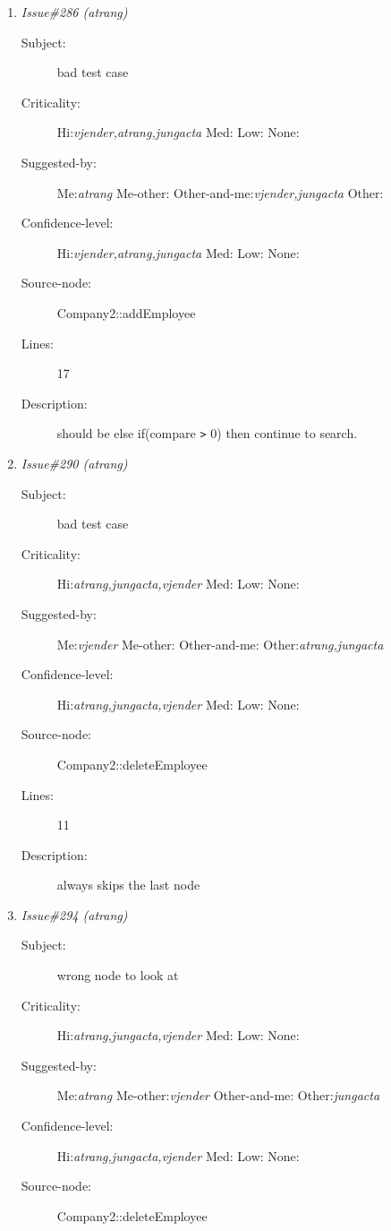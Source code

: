 \begin{enumerate}
\begin{description}
\item [Lines:] 29

\item [Description:] what if the link list is empty?  Will crash for an empty list.
\end{description}
\item {\it Issue\#286 (atrang)}
\begin{description}
\item [Subject:] bad test case
\item [Criticality:] Hi:{\it vjender,atrang,jungacta} Med:{\it } Low:{\it } None:{\it }
\item [Suggested-by:] Me:{\it atrang} Me-other:{\it } Other-and-me:{\it vjender,jungacta} Other:{\it }
\item [Confidence-level:] Hi:{\it vjender,atrang,jungacta} Med:{\it } Low:{\it } None:{\it }
\item [Source-node:] Company2::addEmployee

\item [Lines:] 17

\item [Description:] should be else if(compare {\tt >} 0) then continue to search.
\end{description}
\item {\it Issue\#290 (atrang)}
\begin{description}
\item [Subject:] bad test case
\item [Criticality:] Hi:{\it atrang,jungacta,vjender} Med:{\it } Low:{\it } None:{\it }
\item [Suggested-by:] Me:{\it vjender} Me-other:{\it } Other-and-me:{\it } Other:{\it atrang,jungacta}
\item [Confidence-level:] Hi:{\it atrang,jungacta,vjender} Med:{\it } Low:{\it } None:{\it }
\item [Source-node:] Company2::deleteEmployee

\item [Lines:] 11

\item [Description:] always skips the last node
\end{description}
\item {\it Issue\#294 (atrang)}
\begin{description}
\item [Subject:] wrong node to look at
\item [Criticality:] Hi:{\it atrang,jungacta,vjender} Med:{\it } Low:{\it } None:{\it }
\item [Suggested-by:] Me:{\it atrang} Me-other:{\it vjender} Other-and-me:{\it } Other:{\it jungacta}
\item [Confidence-level:] Hi:{\it atrang,jungacta,vjender} Med:{\it } Low:{\it } None:{\it }
\item [Source-node:] Company2::deleteEmployee


\end{description}
\end{enumerate}
